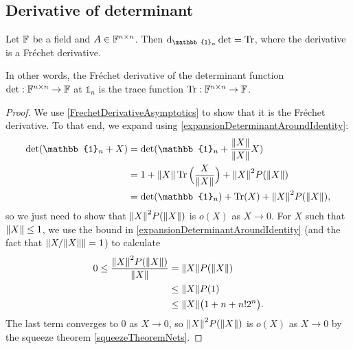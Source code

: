 \subsection{Derivative of determinant}
\begin{proposition} \label{DerivativeDeterminantAtIdentity}
Let $\mathbb{F}$ be a field and $A\in \mathbb{F}^{n\times n}$. Then $\diff{_{\mathbb{1}_n}\det} = \Tr$, where the derivative is a Fréchet derivative.
\end{proposition}
In other words, the Fréchet derivative of the determinant function $\det: \mathbb{F}^{n\times n}\to \mathbb{F}$ at $\mathbb{1}_{n}$ is the trace function $\operatorname{Tr}:\mathbb{F}^{n\times n}\to \mathbb{F}$.
\begin{proof}
We use \ref{FrechetDerivativeAsymptotics} to show that it is the Fréchet derivative. To that end, we expand using \ref{expansionDeterminantAroundIdentity}:
\begin{align*}
\det(\mathbb{1}_n + X) &= \det(\mathbb{1}_n + \frac{\norm{X}}{\norm{X}}X) \\
&= 1 + \norm{X}\Tr\Big(\frac{X}{\norm{X}}\Big) + {\norm{X}}^2 P({\norm{X}}) \\
&= \det(\mathbb{1}_n) + \Tr(X) + {\norm{X}}^2 P({\norm{X}}),
\end{align*}
so we just need to show that ${\lVert X\rVert}^2 P({\lVert X\rVert})$ is $o(X)$ as $X\to 0$. For $X$ such that $\lVert X\rVert \leq 1$, we use the bound in \ref{expansionDeterminantAroundIdentity} (and the fact that $\lVert X/\lVert X\rVert\rVert = 1$) to calculate
\begin{align*}
0\leq \frac{{\lVert X\rVert}^2 P({\lVert X\rVert})}{\lVert X\rVert} &= {\lVert X\rVert} P({\lVert X\rVert}) \\
&\leq {\lVert X\rVert} P(1) \\
&\leq \lVert X\rVert\big(1 + n + n!2^n\big).
\end{align*}
The last term converges to $0$ as $X\to 0$, so ${\lVert X\rVert}^2 P({\lVert X\rVert})$ is $o(X)$ as $X\to 0$ by the squeeze theorem \ref{squeezeTheoremNets}.
\end{proof}


